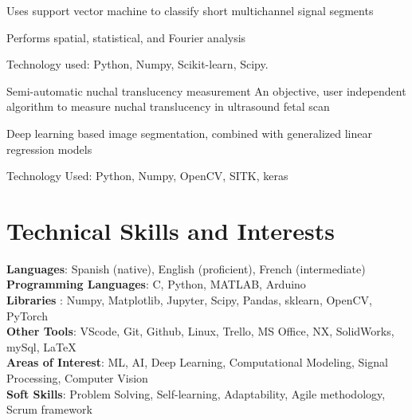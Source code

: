       \resumeItemListStart
        \item {Uses support vector machine to classify short multichannel signal segments}
        \item {Performs spatial, statistical, and Fourier analysis}
        \item {Technology used: Python, Numpy, Scikit-learn, Scipy.}
    \resumeItemListEnd
    \vspace{0.5mm}

    \resumeProject
      {Semi-automatic nuchal translucency measurement} %
      {An objective, user independent algorithm to measure nuchal translucency in ultrasound fetal scan} %
      {} %

      \resumeItemListStart
        \item {Deep learning based image segmentation, combined with generalized linear regression models}
        \item {Technology Used: Python, Numpy, OpenCV, SITK, keras}
    \resumeItemListEnd

  \resumeSubHeadingListEnd


\vspace{-5.5mm}
\section{\textbf{Technical Skills and Interests}}
 \begin{itemize}[leftmargin=0.05in, label={}]
    \small{\item{
    \textbf{Languages}{: Spanish (native), English (proficient), French (intermediate) } \\
     \textbf{Programming Languages}{: C, Python, MATLAB, Arduino } \\
     \textbf{Libraries }{: Numpy, Matplotlib, Jupyter, Scipy, Pandas, sklearn, OpenCV, PyTorch}\\
     \textbf{Other Tools}{: VScode, Git, Github, Linux, Trello, MS Office, NX, SolidWorks, mySql, \LaTeX } \\

     \textbf{Areas of Interest}{: ML, AI, Deep Learning, Computational Modeling, Signal Processing, Computer Vision} \\
     \textbf{Soft Skills}{: Problem Solving, Self-learning, Adaptability, Agile methodology, Scrum framework} \\
    }}
 \end{itemize}


